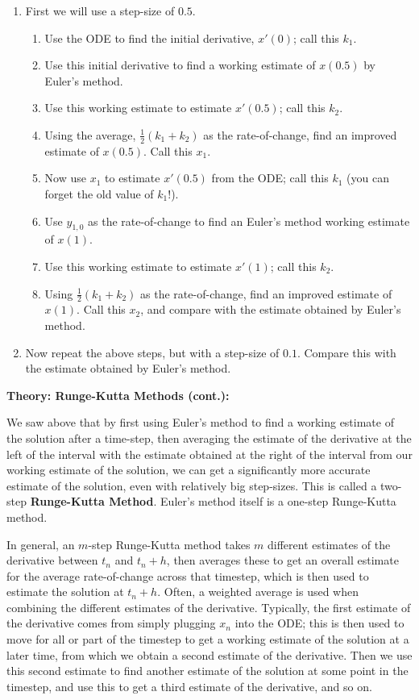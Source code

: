 \documentclass{article}
\begin{document}
\begin{enumerate}
	\item First we will use a step-size of $0.5$.
		\begin{enumerate}
			\item Use the ODE to find the initial derivative, $x'(0)$; call this $k_1$.
			\item Use this initial derivative to find a working estimate of $x(0.5)$ by Euler's method.
			\item Use this working estimate to estimate $x'(0.5)$; call this $k_2$.
			\item Using the average, $\frac{1}{2}(k_1+k_2)$ as the rate-of-change, find an improved estimate of $x(0.5)$. Call this $x_1$.
			\item Now use $x_1$ to estimate $x'(0.5)$ from the ODE; call this $k_1$ (you can forget the old value of $k_1$!).
			\item Use $y_{1,0}$ as the rate-of-change to find an Euler's method working estimate of $x(1)$.
			\item Use this working estimate to estimate $x'(1)$; call this $k_2$.
			\item Using $\frac{1}{2}(k_1+k_2)$ as the rate-of-change, find an improved estimate of $x(1)$. Call this $x_2$, and compare with the estimate obtained by Euler's method.
		\end{enumerate}
	\item Now repeat the above steps, but with a step-size of $0.1$. Compare this with the estimate obtained by Euler's method.
\end{enumerate}




\clearpage





\textbf{Theory: Runge-Kutta Methods (cont.):}\bigskip


We saw above that by first using Euler's method to find a working estimate of the solution after a time-step, then averaging the estimate of the derivative at the left of the interval with the estimate obtained at the right of the interval from our working estimate of the solution, we can get a significantly more accurate estimate of the solution, even with relatively big step-sizes. This is called a two-step \textbf{Runge-Kutta Method}. Euler's method itself is a one-step Runge-Kutta method.

In general, an $m$-step Runge-Kutta method takes $m$ different estimates of the derivative between $t_n$ and $t_n+h$, then averages these to get an overall estimate for the average rate-of-change across that timestep, which is then used to estimate the solution at $t_n+h$. Often, a weighted average is used when combining the different estimates of the derivative. Typically, the first estimate of the derivative comes from simply plugging $x_n$ into the ODE; this is then used to move for all or part of the timestep to get a working estimate of the solution at a later time, from which we obtain a second estimate of the derivative. Then we use this second estimate to find another estimate of the solution at some point in the timestep, and use this to get a third estimate of the derivative, and so on.
\end{document}
